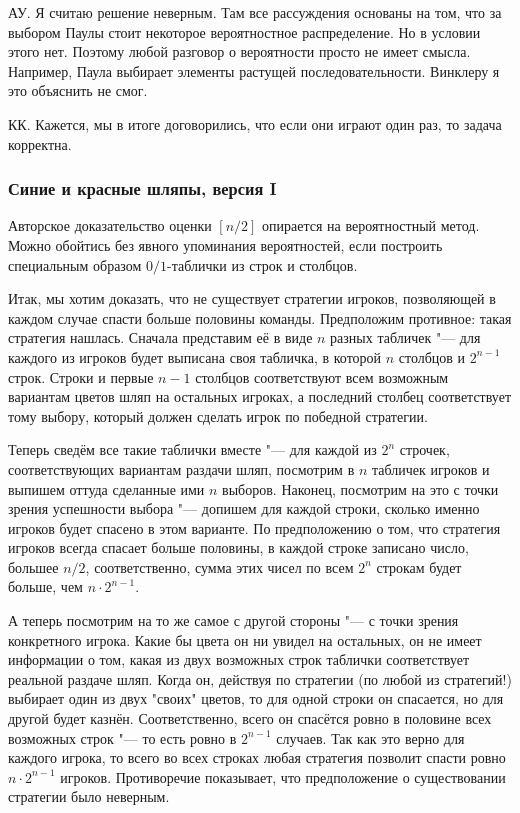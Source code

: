 \documentclass[twoside]{book}
\begin{document}
АУ. Я считаю решение неверным. Там все рассуждения основаны на том, 
что за выбором Паулы стоит некоторое вероятностное распределение. Но в условии этого нет. Поэтому любой разговор 
о вероятности просто не имеет смысла. Например, Паула выбирает элементы растущей последовательности. Винклеру 
я это объяснить не смог.

КК. Кажется, мы в итоге договорились, что если они играют один раз, то задача корректна.


\subsubsection{Синие и красные шляпы, версия I}
Авторское доказательство оценки $[n/2]$ опирается на вероятностный метод. 
Можно обойтись без явного упоминания вероятностей, если построить специальным образом $0/1$-таблички из строк и столбцов.

Итак, мы хотим доказать, что не существует стратегии игроков, позволяющей в каждом случае спасти больше половины команды.
Предположим противное: такая стратегия нашлась.
Сначала представим её в виде $n$ разных табличек "--- для каждого из игроков
будет выписана своя табличка, в которой $n$ столбцов и $2^{n-1}$ строк. Строки и первые $n-1$ столбцов соответствуют всем
возможным вариантам цветов шляп на остальных игроках, а последний столбец соответствует тому выбору, который
должен сделать игрок по победной стратегии. 

Теперь сведём все такие таблички вместе "--- для каждой из $2^n$ строчек, соответствующих вариантам раздачи шляп,
посмотрим в $n$ табличек игроков и выпишем оттуда сделанные ими $n$ выборов. Наконец, посмотрим на это
с точки зрения успешности выбора "--- допишем для каждой строки, сколько именно игроков будет спасено в этом варианте.
По предположению о том, что стратегия игроков всегда спасает больше половины, в каждой строке записано число, большее $n/2$,
соответственно, сумма этих чисел по всем $2^n$ строкам будет больше, чем $n\cdot 2^{n-1}$.

А теперь посмотрим на то же самое с другой стороны "--- с точки зрения конкретного игрока.
Какие бы цвета он ни увидел на остальных, он не имеет информации о том, какая из двух возможных строк таблички соответствует
реальной раздаче шляп. Когда он, действуя по стратегии (по любой из стратегий!) выбирает один из двух "своих" цветов, 
то для одной строки он спасается, но для другой будет казнён. Соответственно, всего он спасётся ровно в половине всех 
возможных строк "--- то есть ровно в $2^{n-1}$ случаев. Так как это верно для каждого игрока, то всего во всех строках 
любая стратегия позволит спасти ровно $n \cdot 2^{n-1}$ игроков. Противоречие показывает, что предположение
о существовании стратегии было неверным.
\end{document}
